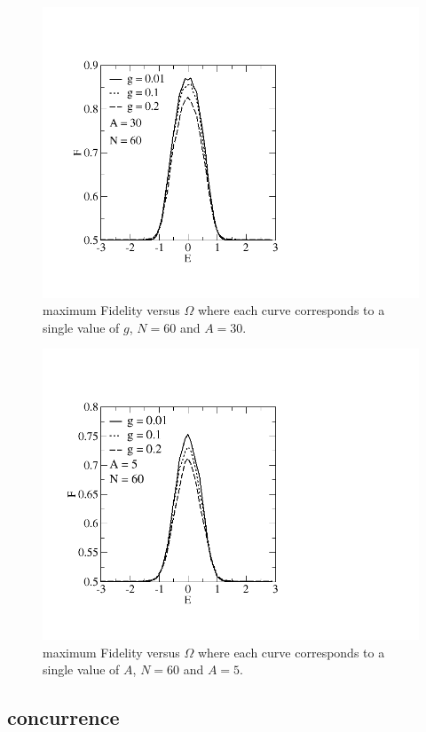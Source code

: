 \documentclass{comjnl}
\begin{document}
\begin{figure}[ht]
  \centering
  \includegraphics[width= \linewidth]{FgA30.png}
  \caption{maximum Fidelity versus $\Omega$ where each curve corresponds to a single value of $g$, $N = 60$ and $A = 30$.}
\end{figure}

\begin{figure}[ht]
  \centering
  \includegraphics[width= \linewidth]{FgA5.png}
  \caption{maximum Fidelity versus $\Omega$ where each curve corresponds to a single value of $A$, $N = 60$ and $A = 5$.}
\end{figure}

\subsection{concurrence}
\end{document}
